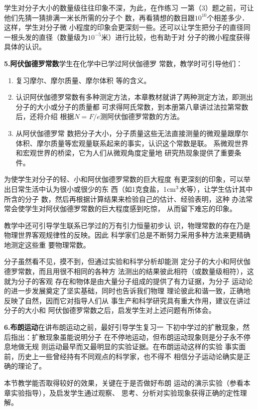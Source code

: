 学生对分子大小的数量级往往印象不深，为此，在作练习
一第（3）题之前，可让他们先猜一猜排满一米长所需的分子个
数，再看猜想的数目跟$10^{10}$个相差多少．这样，学生对分子微
小程度的印象会更深刻一些。还可以让学生把分子的直径同
一根头发的直径（数量级为$10^{-5}$米）进行比较，也有助于对
分子的微小程度获得具体的认识。

\textbf{5.阿伏伽德罗常数}\quad 学生在化学中已学过阿伏伽德罗
常数，教学时可引导他们：
\begin{enumerate}
\item 复习摩尔、摩尔质量、摩尔体积
等的含义。
\item 认识阿伏伽德罗常数有多种测定方法，本章教材就讲了两种测定方法，即测出分子的大小或分子的质量都
可求得阿氏常数，到本册第八章讲过法拉第常数后，还将介绍
根据$N=F/e$测阿伏伽德罗常数的方法。\item 从阿伏伽德罗常
数把分子大小，分子质量这些无法直接测量的微观量跟摩尔
体积、摩尔质量等宏观量联系起来的事实，认识这个常数是联。
系微观世界和宏观世界的桥梁，它为人们从微观角度定量地
研究热现象提供了重要条件。
\end{enumerate}

为使学生对分子的轻、小和阿伏伽德罗常数的巨大程度
有更深刻的印象，可以举出日常生活中认为很小或很少的东
西（如1克食盐，1${\rm cm}^3$水等），让学生估计其中所含的分子
数，然后再根据计算结果来检验自己的估计、经验表明，这种
办法常常会使学生对阿伏伽德罗常数的巨大程度感到吃惊，
从而留下难忘的印象。

教学中还可引导学生联系已学过的万有引力恒量初步认
识，物理常数的存在乃是物理世界客观规律性的反映。因此
科学家们总是不断努力采用多种方法来更精确地测定这些重
要物理常数。

分子虽然看不见，摸不到，但通过实验和科学分析却能测
定分子的大小和阿伏伽德罗常数，而且用很不相同的各种方
法测出的结果彼此相符（或数量级相符），这就为分子的客观
存在和物体是由大量分子组成的提供了有力证据，为分子
运动论的进一步发展奠定了坚实基础，同时也告诉我们物理
理论彼此和谐一致，正确地反映了自然，因而它对指导人们从
事生产和科学研究具有重大作用，建议在讲过分子的大小和
阿伏伽德罗常数之后，启发学生对上述问题有所体会。

\textbf{6.布朗运动}\quad 在讲布朗运动之前，最好引导学生复习一
下初中学过的扩散现象，然后指出：扩散现象虽能说明分子
在不停地运动，但布朗运动现象则是分子永不停息地做无规
则运动最早而又最明显的实验证据。在布朗运动这样的实验
事实面前，历史上一些曾经持有不同观点的科学家，也不得不
相信分子运动论确实是正确的理论了。

本节教学能否取得较好的效果，关键在于是否做好布朗
运动的演示实验（参看本章实验指导），及启发学生通过观察、
思考、分析对实验现象获得正确的定性理解。

